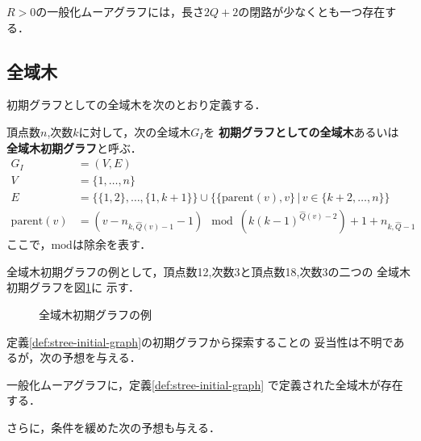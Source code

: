 \begin{conjecture}\rm
  \label{conj:gmg-cycle}
  $R>0$の一般化ムーアグラフには，長さ$2Q+2$の閉路が少なくとも一つ存在する．
\end{conjecture}

\subsection{全域木}
\label{subsect:initial-spanning-tree}
初期グラフとしての全域木を次のとおり定義する．
\begin{definition}\rm
  \label{def:stree-initial-graph}
  頂点数$n$,次数$k$に対して，次の全域木$G_I$を
  \textbf{初期グラフとしての全域木}あるいは
  \textbf{全域木初期グラフ}と呼ぶ．
  \begin{equation}
    \begin{aligned}
      G_I&=(V,E) \\
      V&=\{1,\ldots,n\} \\
      E&=\{\{1,2\},\ldots,\{1,k+1\}\}\cup
      \{\{\text{parent}(v),v\}\,|\,v\in \{k+2,\ldots,n\}\}  \\
      \text{parent}(v)&=
      (v-n_{k,\hat{Q}(v)-1}-1)\mod(k(k-1)^{\hat{Q}(v)-2})+1+n_{k,\hat{Q}-1}
    \end{aligned}
  \end{equation}
  ここで，$\text{mod}$は除余を表す．
\end{definition}

全域木初期グラフの例として，頂点数12,次数3と頂点数18,次数3の二つの
全域木初期グラフを図\ref{fig:initial-spanning-tree-example}に
示す．

\begin{figure}
  \centering
  \hfill
  \caption{全域木初期グラフの例}
  \label{fig:initial-spanning-tree-example}
\end{figure}

定義\ref{def:stree-initial-graph}の初期グラフから探索することの
妥当性は不明であるが，次の予想を与える．
\begin{conjecture}\rm
  \label{conj:spanning-tree}
  一般化ムーアグラフに，定義\ref{def:stree-initial-graph}
  で定義された全域木が存在する．
\end{conjecture}

さらに，条件を緩めた次の予想も与える．

